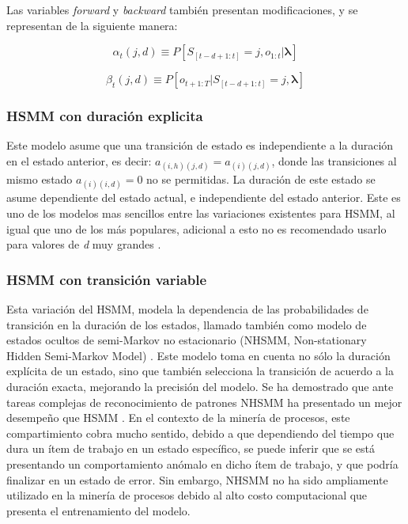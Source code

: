 Las variables \textit{forward} y \textit{backward} también presentan modificaciones, y se representan de la siguiente manera:

  \begin{equation}
    \alpha_{t}(j,d) \equiv P \left[ S_{[t-d+1:t]} = j, o_{1:t} \vert \boldsymbol\lambda \right]
  \end{equation}

  \begin{equation}
    \beta_{t}(j,d) \equiv P \left[ o_{t+1:T} \vert S_{[t-d+1:t]} = j, \boldsymbol\lambda \right]
  \end{equation}

\setcounter{secnumdepth}{4}
\subsubsection{HSMM con duración explicita }

Este modelo asume que una transición de estado es independiente a la duración en el estado anterior, es decir: $a_{(i,h)(j,d)} = a_{(i)(j,d)}$, donde las transiciones al mismo estado $a_{(i)(i,d)} = 0$ no se permitidas. La duración de este estado se asume dependiente del estado actual, e independiente del estado anterior. Este es uno de los modelos mas sencillos entre las variaciones existentes para HSMM, al igual que uno de los más populares, adicional a esto no es recomendado usarlo para valores de \textit{d} muy grandes \cite{Yu2016}.

\subsubsection{HSMM con transición variable }

Esta variación del HSMM, modela la dependencia de las probabilidades de transición en la duración de los estados, llamado también como modelo de estados ocultos de semi-Markov no estacionario (NHSMM, Non-stationary Hidden Semi-Markov Model) \cite{Marhasev2006}. Este modelo toma en cuenta no sólo la duración explícita de un estado, sino que también selecciona la transición de acuerdo a la duración exacta, mejorando la precisión del modelo. Se ha demostrado que ante tareas complejas de reconocimiento de patrones NHSMM ha presentado un mejor desempeño que HSMM \cite{Marhasev2006}. En el contexto de la minería de procesos, este compartimiento cobra mucho sentido, debido a que dependiendo del tiempo que dura un ítem de trabajo en un estado específico, se puede inferir que se está presentando un comportamiento anómalo en dicho ítem de trabajo, y que podría finalizar en un estado de error. Sin embargo, NHSMM no ha sido ampliamente utilizado en la minería de procesos debido al alto costo computacional que presenta el entrenamiento del modelo.


